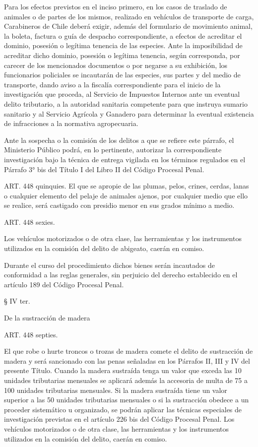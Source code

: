     Para los efectos previstos en el inciso primero, en los casos de traslado de animales o de partes de los mismos, realizado en vehículos de transporte de carga, Carabineros de Chile deberá exigir, además del formulario de movimiento animal, la boleta, factura o guía de despacho correspondiente, a efectos de acreditar el dominio, posesión o legítima tenencia de las especies. Ante la imposibilidad de acreditar dicho dominio, posesión o legítima tenencia, según corresponda, por carecer de los mencionados documentos o por negarse a su exhibición, los funcionarios policiales se incautarán de las especies, sus partes y del medio de transporte, dando aviso a la fiscalía correspondiente para el inicio de la investigación que proceda, al Servicio de Impuestos Internos ante un eventual delito tributario, a la autoridad sanitaria competente para que instruya sumario sanitario y al Servicio Agrícola y Ganadero para determinar la eventual existencia de infracciones a la normativa agropecuaria.
   
    Ante la sospecha o la comisión de los delitos a que se refiere este párrafo, el Ministerio Público podrá, en lo pertinente, autorizar la correspondiente investigación bajo la técnica de entrega vigilada en los términos regulados en el Párrafo 3° bis del Título I del Libro II del Código Procesal Penal.

    ART. 448 quinquies.
    El que se apropie de las plumas, pelos, crines, cerdas, lanas o cualquier elemento del pelaje de animales ajenos, por cualquier medio que ello se realice, será castigado con presidio menor en sus grados mínimo a medio.

    ART. 448 sexies.

    Los vehículos motorizados o de otra clase, las herramientas y los instrumentos utilizados en la comisión del delito de abigeato, caerán en comiso.

    Durante el curso del procedimiento dichos bienes serán incautados de conformidad a las reglas generales, sin perjuicio del derecho establecido en el artículo 189 del Código Procesal Penal.

    § IV ter.
   
    De la sustracción de madera


     
    ART. 448 septies.

    El que robe o hurte troncos o trozas de madera comete el delito de sustracción de madera y será sancionado con las penas señaladas en los Párrafos II, III y IV del presente Título. Cuando la madera sustraída tenga un valor que exceda las 10 unidades tributarias mensuales se aplicará además la accesoria de multa de 75 a 100 unidades tributarias mensuales.
    Si la madera sustraída tiene un valor superior a las 50 unidades tributarias mensuales o si la sustracción obedece a un proceder sistemático u organizado, se podrán aplicar las técnicas especiales de investigación previstas en el artículo 226 bis del Código Procesal Penal.
    Los vehículos motorizados o de otra clase, las herramientas y los instrumentos utilizados en la comisión del delito, caerán en comiso.
     
